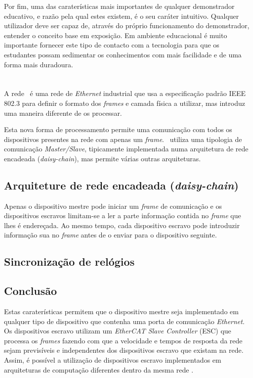 Por fim, uma das caraterísticas mais importantes de qualquer demonstrador
educativo, e razão pela qual estes existem, é o seu caráter intuitivo.
Qualquer utilizador deve ser capaz de, através do próprio funcionamento
do demonstrador, entender o conceito base em exposição. Em ambiente
educacional é muito importante fornecer este tipo de contacto com a
tecnologia para que os estudantes possam sedimentar os conhecimentos com
mais facilidade e de uma forma mais duradoura. %


\section{\ecat}\label{sec:ethercat}

A rede \ecat\ é uma rede de \emph{Ethernet} industrial que usa a
especificação padrão IEEE 802.3 \cite[]{ieee:IEEEStandardEthernet} para
definir o formato dos \emph{frames} e camada física a utilizar, mas
introduz uma maneira diferente de os processar.

Esta nova forma de processamento permite uma comunicação com todos os
dispositivos presentes na rede com apenas um \emph{frame}. \ecat\ utiliza
uma tipologia de comunicação \emph{Master/Slave}, tipicamente implementada
numa arquitetura de rede encadeada (\emph{daisy-chain}), mas permite várias
outras arquiteturas.

\subsection{Arquiteture de rede encadeada (\emph{daisy-chain})}
\label{sec:daisychain}
Apenas o dispositivo mestre pode iniciar um \emph{frame} de comunicação
e os dispositivos escravos limitam-se a ler a parte informação contida
no \emph{frame} que lhes é endereçada. Ao mesmo tempo, cada dispositivo
escravo pode introduzir informação sua  no \emph{frame} antes de o enviar
para o dispositivo seguinte.

\subsection{Sincronização de relógios}

\subsection{Conclusão}
Estas caraterísticas permitem que o dispositivo mestre seja implementado
em qualquer tipo de dispositivo que contenha uma porta de comunicação 
\emph{Ethernet}. Os dispositivos escravo utilizam um \emph{EtherCAT Slave
Controller} (ESC) que processa os \emph{frames} fazendo com que a velocidade
e tempos de resposta da rede sejam previsíveis e independentes dos 
dispositivos escravo que existam na rede. Assim, é possível a utilização
de dispositivos escravo implementados em arquiteturas de computação
diferentes dentro da mesma rede \ecat.


